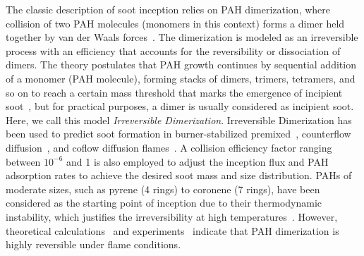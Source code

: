 
The classic description of soot inception relies on PAH dimerization, where collision of two PAH molecules (monomers in this context) forms a dimer held together by van der Waals forces~\citep{frenklach1991detailed}. The dimerization is modeled as an irreversible process with an efficiency that accounts for the reversibility or dissociation of dimers. The theory postulates that PAH growth continues by sequential addition of a monomer (PAH molecule), forming stacks of dimers, trimers, tetramers, and so on to reach a certain mass threshold that marks the emergence of incipient soot~\citep{frenklach1991detailed}, but for practical purposes, a dimer is usually considered as incipient soot. Here, we call this model \textit{Irreversible Dimerization}. Irreversible Dimerization has been used to predict soot formation in burner-stabilized premixed~\citep{salenbauch2015modeling, desgroux2017comparative}, counterflow diffusion~\citep{wang2015soot, xu2021experimental}, and coflow diffusion flames~\citep{kholghy2016core, veshkini2016understanding}. A collision efficiency factor ranging between $10^{-6}$ and 1 is also employed to adjust the inception flux and PAH adsorption rates to achieve the desired soot mass and size distribution. PAHs of moderate sizes, such as pyrene (4 rings) to coronene (7 rings), have been considered as the starting point of inception due to their thermodynamic instability, which justifies the irreversibility at high temperatures~\citep{frenklach1991detailed}. However, theoretical calculations~\citep{miller1985calculations} and experiments~\citep{sabbah2010exploring} indicate that PAH dimerization is highly reversible under flame conditions.

